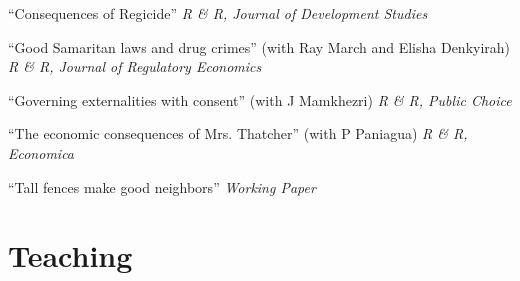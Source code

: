 \documentclass[12pt,letterpaper]{report}
\newcommand{\listitemspace}{0.15em} %
\renewenvironment{itemize}
{\begin{list}{}{\setlength{\leftmargin}{0em}
            \setlength{\parskip}{0em}
            \setlength{\itemsep}{\listitemspace}
            \setlength{\parsep}{\listitemspace}}}
{\end{list}}
\begin{document}
\begin{itemize}

\item [] ``Consequences of Regicide'' \textit{R \& R, Journal of Development Studies}
\item [] ``Good Samaritan laws and drug crimes'' (with Ray March and Elisha Denkyirah) \textit{R \& R, Journal of Regulatory Economics}
\item [] ``Governing externalities with consent'' (with J Mamkhezri) \textit{R \& R, Public Choice}
\item [] ``The economic consequences of Mrs. Thatcher'' (with P Paniagua) \textit{R \& R, Economica}
\item [] ``Tall fences make good neighbors'' \textit{Working Paper}





\end{itemize}

	\section*{Teaching}
\end{document}

